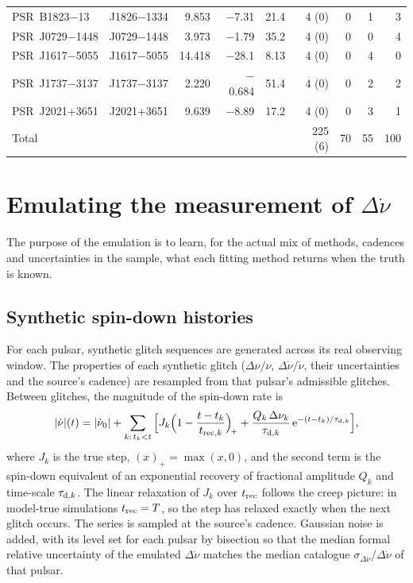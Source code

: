\documentclass[fleqn,usenatbib]{mnras}
\newcommand{\dnu}{\Delta\nu/\nu}
\newcommand{\dnud}{\Delta\dot\nu/\dot\nu}
\begin{document}
\begin{table}
\begin{tabular}{llrrrrrrr}
PSR~B1823$-$13 & J1826$-$1334 & 9.853 & $-$7.31 & 21.4 & 4 (0) & 0 & 1 & 3 \\
PSR~J0729$-$1448 & J0729$-$1448 & 3.973 & $-$1.79 & 35.2 & 4 (0) & 0 & 0 & 4 \\
PSR~J1617$-$5055 & J1617$-$5055 & 14.418 & $-$28.1 & 8.13 & 4 (0) & 0 & 4 & 0 \\
PSR~J1737$-$3137 & J1737$-$3137 & 2.220 & $-$0.684 & 51.4 & 4 (0) & 0 & 2 & 2 \\
PSR~J2021+3651 & J2021+3651 & 9.639 & $-$8.89 & 17.2 & 4 (0) & 0 & 3 & 1 \\
\midrule
Total & & & & & 225 (6) & 70 & 55 & 100\\
\bottomrule
\end{tabular}
\end{table}

\section{Emulating the measurement of \texorpdfstring{$\Delta\dot\nu$}{the spin-down step}}\label{sec:emul}
The purpose of the emulation is to learn, for the actual mix of methods,
cadences and uncertainties in the sample, what each fitting method returns
when the truth is known.

\subsection{Synthetic spin-down histories}
For each pulsar, synthetic glitch sequences are generated across its real
observing window. The properties of each synthetic glitch ($\dnu$, $\dnud$,
their uncertainties and the source's cadence) are resampled from that
pulsar's admissible glitches. Between glitches, the magnitude of the
spin-down rate is
\begin{equation}\label{eq:nudot}
|\dot\nu|(t)=|\dot\nu_0|+\sum_{k:\,t_k<t}
\Big[J_k\Big(1-\frac{t-t_k}{t_{{\rm rec},k}}\Big)_{\!+}
+\frac{Q_k\,\Delta\nu_k}{\tau_{{\rm d},k}}\,{\rm e}^{-(t-t_k)/\tau_{{\rm d},k}}
\Big],
\end{equation}
where $J_k$ is the true step, $(x)_+=\max(x,0)$, and the second term is the
spin-down equivalent of an exponential recovery of fractional amplitude
$Q_k$ and time-scale $\tau_{{\rm d},k}$. The linear relaxation of $J_k$ over
$t_{\rm rec}$ follows the creep picture: in model-true simulations
$t_{\rm rec}=T$, so the step has relaxed exactly when the next glitch
occurs. The series is sampled at the source's cadence. Gaussian noise is
added, with its level set for each pulsar by bisection so that the median
formal relative uncertainty of the emulated $\Delta\dot\nu$ matches the
median catalogue $\sigma_{\Delta\dot\nu}/\Delta\dot\nu$ of that pulsar.
\end{document}

